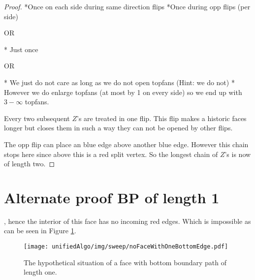 \begin{proof}
    *Once on each side during same direction flips
    *Once during opp flips (per side)

    OR

    * Just once

    OR

    * We just do not care as long as we do not open topfans (Hint: we do not)
    * However we do enlarge topfans (at most by 1 on every side) so we end up with $3-\infty$ topfans.

    Every two subsequent $Z$'s are treated in one flip. This flip makes a historic faces longer but closes them in such a way they can not be opened by other flips.

    The opp flip can place an blue edge above another blue edge. However this chain stops here since above this is a red split vertex. So the longest chain of $Z$'s is now of length two.
  \end{proof}
  
  \section{Alternate proof BP of length 1}
        , hence the interior of this face has no incoming red edges.
      Which is impossible as can be seen in Figure \ref{fig:sweep:noFaceWithOneBottomEdge}.

      \begin{figure}[h]
        \centering
        \texttt{[image: unifiedAlgo/img/sweep/noFaceWithOneBottomEdge.pdf]}
        \caption{The hypothetical situation of a face with bottom boundary path of length one.}
        \label{fig:sweep:noFaceWithOneBottomEdge}
      \end{figure}

